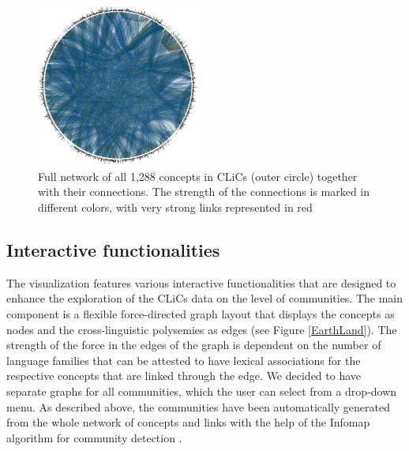 \begin{figure}[b]
    \centering
   \includegraphics[width=0.48\textwidth]{img/completeNetworkLabels.jpg}
    \caption{Full network of all 1,288 concepts in CLiCs (outer circle) together with their connections. The strength of the connections is marked in different colors, with very strong links represented in red}
    \label{fig:clics_full}
\end{figure}
\subsection{Interactive functionalities}



The visualization features various interactive functionalities that are designed to enhance the exploration of the CLiCs data on the level of communities. The main component is a flexible force-directed graph layout that displays the concepts as nodes and the cross-linguistic polysemies as edges (see Figure \ref{EarthLand}). The strength of the force in the edges of the graph is dependent on the number of language families that can be attested to have lexical associations for the respective concepts that are linked through the edge. We decided to have separate graphs for all communities, which the user can select from a drop-down menu. As described above, the communities have been automatically generated from the whole network of concepts and links with the help of the Infomap algorithm for community detection \cite{Rosvall2008}. 

